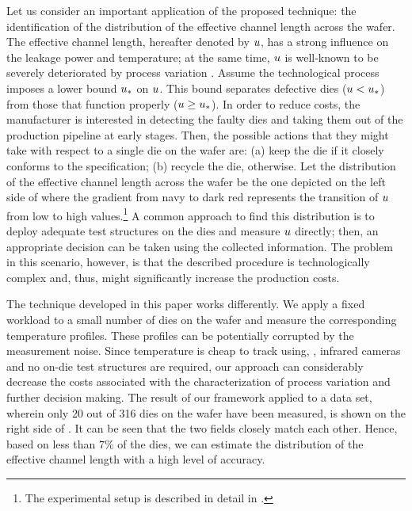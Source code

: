 
Let us consider an important application of the proposed technique: the identification of the distribution of the effective channel length across the wafer. The effective channel length, hereafter denoted by $u$, has a strong influence on the leakage power and temperature; at the same time, $u$ is well-known to be severely deteriorated by process variation \cite{srivastava2010, juan2011, juan2012}.
Assume the technological process imposes a lower bound $u_*$ on $u$. This bound separates defective dies ($u < u_*$) from those that function properly ($u \geq u_*$).
In order to reduce costs, the manufacturer is interested in detecting the faulty dies and taking them out of the production pipeline at early stages. Then, the possible actions that they might take with respect to a single die on the wafer are: (a) keep the die if it closely conforms to the specification; (b) recycle the die, otherwise.
Let the distribution of the effective channel length across the wafer be the one depicted on the left side of  where the gradient from navy to dark red represents the transition of $u$ from low to high values.\footnote{The experimental setup is described in detail in .}
A common approach to find this distribution is to deploy adequate test structures on the dies and measure $u$ directly; then, an appropriate decision can be taken using the collected information. The problem in this scenario, however, is that the described procedure is technologically complex and, thus, might significantly increase the production costs.

The technique developed in this paper works differently. We apply a fixed workload to a small number of dies on the wafer and measure the corresponding temperature profiles. These profiles can be potentially corrupted by the measurement noise. Since temperature is cheap to track using, \eg, infrared cameras and no on-die test structures are required, our approach can considerably decrease the costs associated with the characterization of process variation and further decision making.
The result of our framework applied to a data set, wherein only 20 out of 316 dies on the wafer have been measured, is shown on the right side of . It can be seen that the two fields closely match each other. Hence, based on less than $7\%$ of the dies, we can estimate the distribution of the effective channel length with a high level of accuracy.

